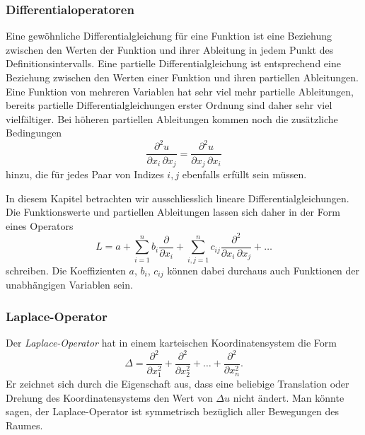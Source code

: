 \subsubsection{Differentialoperatoren}
Eine gewöhnliche Differentialgleichung für eine Funktion
ist eine Beziehung zwischen den Werten der Funktion und ihrer
Ableitung in jedem Punkt des Definitionsintervalls.
Eine partielle Differentialgleichung ist entsprechend eine
Beziehung zwischen den Werten einer Funktion und ihren partiellen
Ableitungen.
Eine Funktion von mehreren Variablen hat sehr viel mehr partielle
Ableitungen, bereits partielle Differentialgleichungen erster
Ordnung sind daher sehr viel vielfältiger.
Bei höheren partiellen Ableitungen kommen noch die zusätzliche Bedingungen
\[
\frac{\partial^2 u}{\partial x_i\,\partial x_j}
=
\frac{\partial^2 u}{\partial x_j\,\partial x_i}
\]
hinzu, die für jedes Paar von Indizes $i,j$ ebenfalls erfüllt sein
müssen.

In diesem Kapitel betrachten wir ausschliesslich lineare
Differentialgleichungen.
Die Funktionswerte und partiellen Ableitungen lassen sich daher
in der Form eines Operators
\[
L 
=
a
+ \sum_{i=1}^n b_i \frac{\partial}{\partial x_i}
+ \sum_{i,j=1}^n c_{ij} \frac{\partial^2}{\partial x_i\,\partial x_j}
+ \dots
\]
schreiben.
Die Koeffizienten $a$, $b_i$, $c_{ij}$ können dabei durchaus auch
Funktionen der unabhängigen Variablen sein.

%
%
\subsubsection{Laplace-Operator}
Der {\em Laplace-Operator} hat in einem karteischen Koordinatensystem die
Form
%
\[
\Delta
=
\frac{\partial^2}{\partial x_1^2}
+
\frac{\partial^2}{\partial x_2^2}
+
\dots
+
\frac{\partial^2}{\partial x_n^2}.
\]
Er zeichnet sich durch die Eigenschaft aus, dass eine beliebige 
Translation oder Drehung des Koordinatensystems den Wert von $\Delta u$
nicht ändert.
Man könnte sagen, der Laplace-Operator ist symmetrisch bezüglich
aller Bewegungen des Raumes.

%
%

